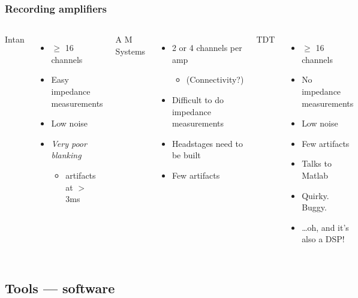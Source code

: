 \documentclass{beamer}
\begin{document}
\begin{frame}
  \frametitle{Recording amplifiers}
  \begin{columns}
    \column{33mm}
    Intan
    \begin{itemize}
      \item $\geq$ 16 channels
      \item Easy impedance measurements
      \item Low noise
      \item {\it Very poor blanking}
        \begin{itemize}
        \item artifacts at $>$ 3ms
        \end{itemize}
    \end{itemize}
    \column{33mm}
    A M Systems
    \begin{itemize}
      \item 2 or 4 channels per amp
        \begin{itemize}
          \item (Connectivity?)
        \end{itemize}
      \item Difficult to do impedance measurements
      \item Headstages need to be built
      \item Few artifacts
    \end{itemize}
    \column{33mm}
    TDT
    \begin{itemize}
      \item $\geq$ 16 channels
      \item No impedance measurements
      \item Low noise
      \item Few artifacts
      \item Talks to Matlab
      \item Quirky.  Buggy.
      \item \dots oh, and it's also a DSP!
    \end{itemize}
  \end{columns}
\end{frame}

\subsection{Tools --- software}
\end{document}
